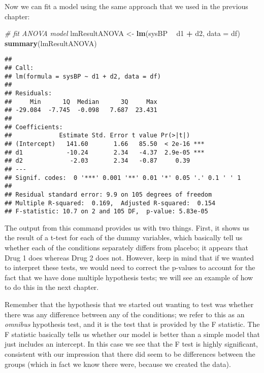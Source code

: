 \documentclass[]{book}
\newenvironment{Shaded}{\begin{snugshade}}{\end{snugshade}}
\newcommand{\KeywordTok}[1]{\textcolor[rgb]{0.13,0.29,0.53}{\textbf{#1}}}
\newcommand{\DataTypeTok}[1]{\textcolor[rgb]{0.13,0.29,0.53}{#1}}
\newcommand{\StringTok}[1]{\textcolor[rgb]{0.31,0.60,0.02}{#1}}
\newcommand{\CommentTok}[1]{\textcolor[rgb]{0.56,0.35,0.01}{\textit{#1}}}
\newcommand{\OperatorTok}[1]{\textcolor[rgb]{0.81,0.36,0.00}{\textbf{#1}}}
\newcommand{\NormalTok}[1]{#1}
\theoremstyle{definition}
\theoremstyle{definition}
\theoremstyle{definition}
\theoremstyle{remark}
\begin{document}
Now we can fit a model using the same approach that we used in the
previous chapter:

\begin{Shaded}
\begin{Highlighting}[]
\CommentTok{# fit ANOVA model}
\NormalTok{lmResultANOVA <-}\StringTok{ }\KeywordTok{lm}\NormalTok{(sysBP }\OperatorTok{~}\StringTok{ }\NormalTok{d1 }\OperatorTok{+}\StringTok{ }\NormalTok{d2, }\DataTypeTok{data =}\NormalTok{ df)}
\KeywordTok{summary}\NormalTok{(lmResultANOVA)}
\end{Highlighting}
\end{Shaded}

\begin{verbatim}
## 
## Call:
## lm(formula = sysBP ~ d1 + d2, data = df)
## 
## Residuals:
##     Min      1Q  Median      3Q     Max 
## -29.084  -7.745  -0.098   7.687  23.431 
## 
## Coefficients:
##             Estimate Std. Error t value Pr(>|t|)    
## (Intercept)   141.60       1.66   85.50  < 2e-16 ***
## d1            -10.24       2.34   -4.37  2.9e-05 ***
## d2             -2.03       2.34   -0.87     0.39    
## ---
## Signif. codes:  0 '***' 0.001 '**' 0.01 '*' 0.05 '.' 0.1 ' ' 1
## 
## Residual standard error: 9.9 on 105 degrees of freedom
## Multiple R-squared:  0.169,  Adjusted R-squared:  0.154 
## F-statistic: 10.7 on 2 and 105 DF,  p-value: 5.83e-05
\end{verbatim}

The output from this command provides us with two things. First, it
shows us the result of a t-test for each of the dummy variables, which
basically tell us whether each of the conditions separately differs from
placebo; it appears that Drug 1 does whereas Drug 2 does not. However,
keep in mind that if we wanted to interpret these tests, we would need
to correct the p-values to account for the fact that we have done
multiple hypothesis tests; we will see an example of how to do this in
the next chapter.

Remember that the hypothesis that we started out wanting to test was
whether there was any difference between any of the conditions; we refer
to this as an \emph{omnibus} hypothesis test, and it is the test that is
provided by the F statistic. The F statistic basically tells us whether
our model is better than a simple model that just includes an intercept.
In this case we see that the F test is highly significant, consistent
with our impression that there did seem to be differences between the
groups (which in fact we know there were, because we created the data).
\end{document}
